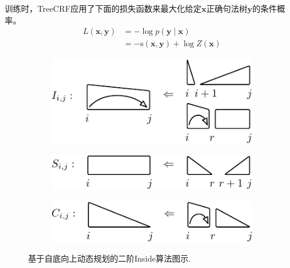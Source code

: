 训练时，TreeCRF应用了下面的损失函数来最大化给定$\boldsymbol{x}$正确句法树$\boldsymbol{y}$的条件概率。
\begin{equation}\label{eq:training-loss-treecrf}
	\begin{split}
		\mathit{L}(\boldsymbol{x},\boldsymbol{y}) &= -\log p(\boldsymbol{y}\mid\boldsymbol{x})  \\
		&= - \mathrm{s}(\boldsymbol{x}, \boldsymbol{y}) + \log Z(\boldsymbol{x})
	\end{split}
\end{equation}

\begin{figure}[tb]
	\centering
	\begin{subfigure}[b]{\textwidth}
		\begin{minipage}{\textwidth}
			\centering
			\includegraphics[scale=1.35]{figures/eisner-2o/a.pdf}
			\label{fig:eisner-2o-a}
		\end{minipage}
	\end{subfigure}
	\begin{subfigure}[b]{\textwidth}
		\begin{minipage}{\textwidth}
			\centering
			\includegraphics[scale=1.35]{figures/eisner-2o/b.pdf}
			\label{fig:eisner-2o-b}
		\end{minipage}
	\end{subfigure}
	\begin{subfigure}[b]{\textwidth}
		\begin{minipage}{\textwidth}
			\centering
			\includegraphics[scale=1.35]{figures/eisner-2o/c.pdf}
			\label{fig:eisner-2o-c}
		\end{minipage}
	\end{subfigure}
	\caption{基于自底向上动态规划的二阶Inside算法图示.}
	\label{fig:eisner-2o}
\end{figure}


